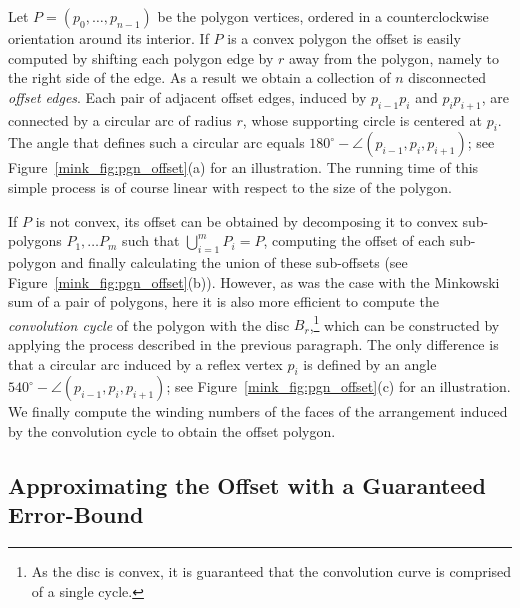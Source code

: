Let $P = \left( p_0, \ldots, p_{n - 1} \right)$ be the polygon vertices,
ordered in a counterclockwise orientation around its interior. 
If $P$ is a convex polygon the offset is easily computed by
shifting each polygon edge by $r$ away from the polygon, namely to
the right side of the edge. As a result we obtain a collection of
$n$ disconnected \emph{offset edges}. Each pair of adjacent offset
edges, induced by $p_{i-1} p_i$ and $p_i p_{i+1}$, are connected
by a circular arc of radius $r$, whose supporting circle is
centered at $p_i$. The angle that defines such a circular arc
equals $180^{\circ} - \angle (p_{i-1}, p_i, p_{i+1})$; see
Figure~\ref{mink_fig:pgn_offset}(a) for an illustration. The running
time of this simple process is of course linear with respect to
the size of the polygon.

If $P$ is not convex, its offset can be obtained by decomposing it
to convex sub-polygons $P_1, \ldots P_m$ such that
$\bigcup_{i=1}^{m}{P_i} = P$, computing the offset of each
sub-polygon and finally calculating the union of these sub-offsets
(see Figure~\ref{mink_fig:pgn_offset}(b)). However, as was the case with
the Minkowski sum of a pair of polygons, here it is also more
efficient to compute the \emph{convolution cycle} of the polygon
with the disc $B_r$,\footnote{As the disc is convex, it is guaranteed
that the convolution curve is comprised of a single cycle.} which can be
constructed by applying the process described in the previous
paragraph. The only difference is that a circular arc induced by a
reflex vertex $p_i$ is defined by an angle $540^{\circ} - \angle
(p_{i-1}, p_i, p_{i+1})$; see Figure~\ref{mink_fig:pgn_offset}(c) for an
illustration. We finally compute the winding numbers of the faces of the
arrangement induced by the convolution cycle to obtain the offset
polygon.

\subsection{Approximating the Offset with a Guaranteed Error-Bound}
\label{mink_ssec:approx_offset}


